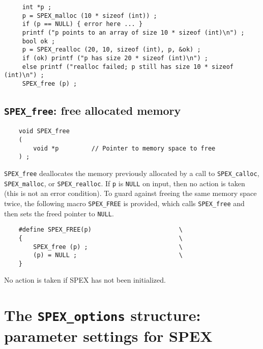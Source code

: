 \documentclass[12pt]{report}
\theoremstyle{definition}
\begin{document}
\begin{mdframed}[userdefinedwidth=6in]
{\footnotesize
\begin{verbatim}
     int *p ;
     p = SPEX_malloc (10 * sizeof (int)) ;
     if (p == NULL) { error here ... }
     printf ("p points to an array of size 10 * sizeof (int)\n") ;
     bool ok ;
     p = SPEX_realloc (20, 10, sizeof (int), p, &ok) ;
     if (ok) printf ("p has size 20 * sizeof (int)\n") ;
     else printf ("realloc failed; p still has size 10 * sizeof (int)\n") ;
     SPEX_free (p) ;
\end{verbatim}
} \end{mdframed}

\cprotect\subsection{\verb|SPEX_free|: free allocated memory}
\label{ss:SPEX_free}

\begin{mdframed}[userdefinedwidth=6in]
{\footnotesize
\begin{verbatim}
    void SPEX_free
    (
        void *p         // Pointer to memory space to free
    ) ;
\end{verbatim}
} \end{mdframed}

\verb|SPEX_free| deallocates the memory previously allocated by a call to
\verb|SPEX_calloc|, \verb|SPEX_malloc|, or \verb|SPEX_realloc|.  If \verb|p| is
\verb|NULL| on input, then no action is taken (this is not an error condition).
To guard against freeing the same memory space twice, the following macro
\verb|SPEX_FREE| is provided, which calls \verb|SPEX_free| and then sets the
freed pointer to \verb|NULL|.

\begin{mdframed}[userdefinedwidth=6in]
{\footnotesize
\begin{verbatim}
    #define SPEX_FREE(p)                        \
    {                                           \
        SPEX_free (p) ;                         \
        (p) = NULL ;                            \
    }
\end{verbatim}
} \end{mdframed}

No action is taken if SPEX has not been initialized.

\cprotect\section{The \verb|SPEX_options| structure:
parameter settings for SPEX} \label{ss:SPEX_options}
\end{document}
